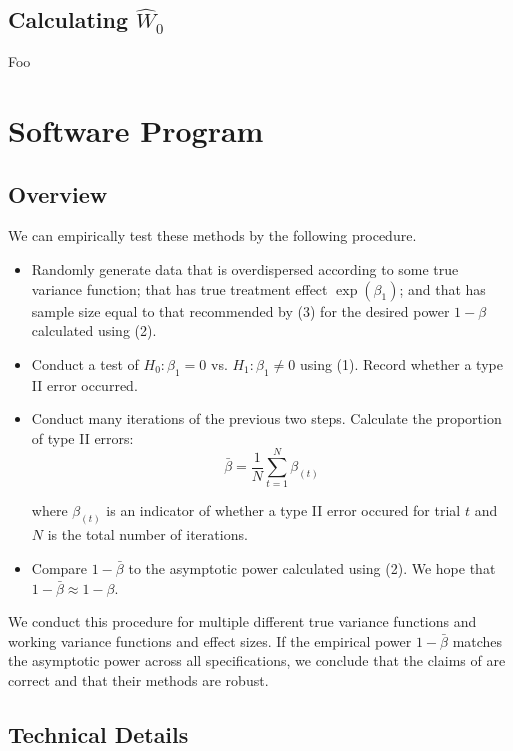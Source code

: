 \documentclass{article}
\begin{document}
\normalsize

\subsection{Calculating $\hat{W}_0$}
Foo

\section{Software Program}

\subsection{Overview}

We can empirically test these methods by the following procedure.

\begin{itemize}
	\item Randomly generate data that is overdispersed according to some
		true variance function; that has true treatment
		effect $\exp{(\beta_1)}$; and that has sample size equal to that
		recommended by (3) for the desired power $1-\beta$ calculated
		using (2).
	\item Conduct a test of $H_0: \beta_1 = 0$ vs. $H_1: \beta_1 \neq 0$
		using (1). Record whether a type II error occurred.
	\item Conduct many iterations of the previous two steps.
		Calculate the proportion of type II errors:
		$$
		\bar{\beta} = \frac{1}{N}\sum_{t = 1}^N \beta_{(t)}
		$$

		where $\beta_{(t)}$ is an indicator of whether a type II error
		occured for trial $t$ and $N$ is the total number of iterations.
	\item Compare $1-\bar{\beta}$ to the asymptotic power calculated using (2). We
		hope that $1-\bar{\beta} \approx 1 - \beta$.
\end{itemize}

We conduct this procedure for multiple different true variance functions and
working variance functions and effect sizes. If the empirical power $1 - \bar{\beta}$ 
matches the asymptotic power across all specifications, we conclude that the claims of
\cite{igeta2018} are correct and that their methods are robust.

\subsection{Technical Details}
\end{document}
